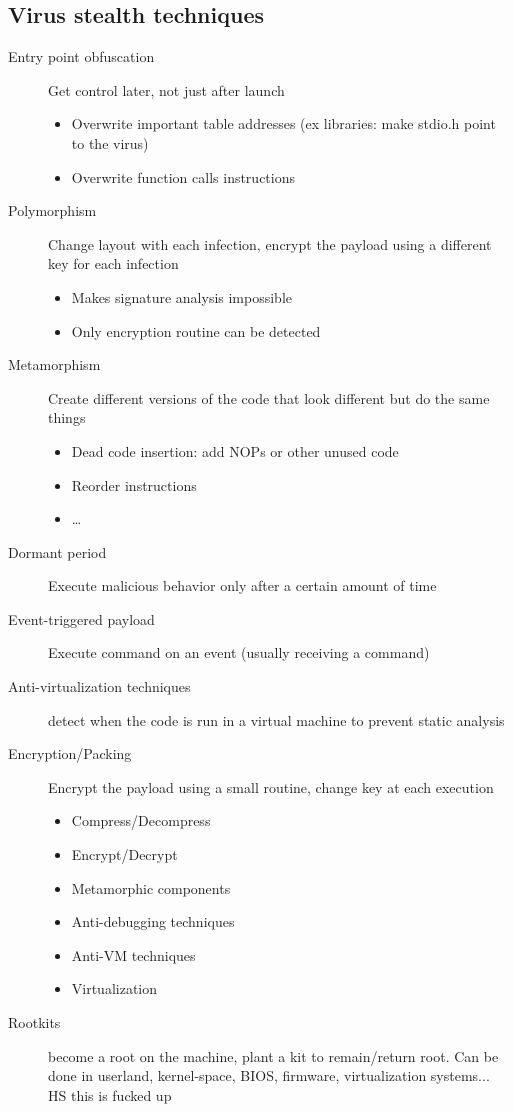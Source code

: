 \documentclass{article}
\begin{document}
\subsection{Virus stealth techniques}
\begin{description}
\item[Entry point obfuscation] Get control later, not just after launch
	\begin{itemize}
	\item Overwrite important table addresses (ex libraries: make stdio.h point to the virus)
	\item Overwrite function calls instructions
	\end{itemize}
\item[Polymorphism] Change layout with each infection, encrypt the payload using a different key for each infection
	\begin{itemize}
	\item Makes signature analysis impossible
	\item Only encryption routine can be detected
	\end{itemize}
\item[Metamorphism] Create different versions of the code that look different but do the same things
	\begin{itemize}
	\item Dead code insertion: add NOPs or other unused code 
	\item Reorder instructions
	\item \dots
	\end{itemize}
\item[Dormant period] Execute malicious behavior only after a certain amount of time
\item[Event-triggered payload] Execute command on an event (usually receiving a command)
\item[Anti-virtualization techniques] detect when the code is run in a virtual machine to prevent static analysis
\item[Encryption/Packing] Encrypt the payload using a small routine, change key at each execution
	\begin{itemize}
	\item Compress/Decompress
	\item Encrypt/Decrypt
	\item Metamorphic components
	\item Anti-debugging techniques
	\item Anti-VM techniques
	\item Virtualization
	\end{itemize}
\item[Rootkits] become a root on the machine, plant a kit to remain/return root. Can be done in userland, kernel-space, BIOS, firmware, virtualization systems... HS this is fucked up
\end{description}
\end{document}
